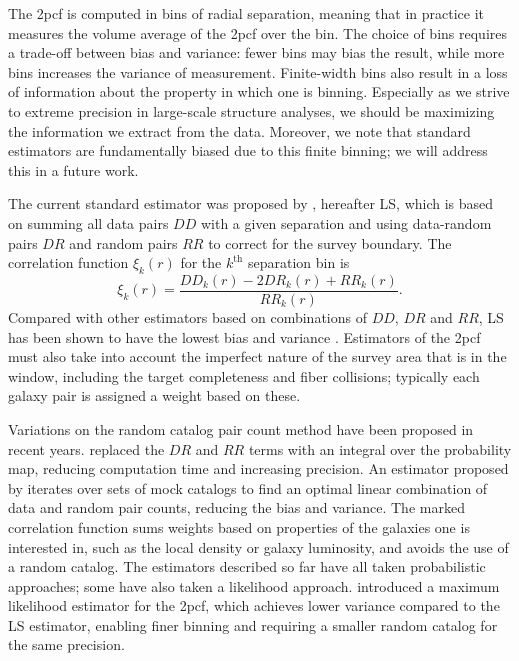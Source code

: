 \documentclass[twocolumn]{aastex62}
\newcommand{\cf}{2pcf\xspace} %
\begin{document}
The \cf is computed in bins of radial separation, meaning that in practice it measures the volume average of the \cf over the bin.
The choice of bins requires a trade-off between bias and variance: fewer bins may bias the result, while more bins increases the variance of measurement.
Finite-width bins also result in a loss of information about the property in which one is binning. 
Especially as we strive to extreme precision in large-scale structure analyses, we should be maximizing the information we extract from the data.
Moreover, we note that standard estimators are fundamentally biased due to this finite binning; we will address this in a future work. %

The current standard estimator was proposed by \cite{LandySzalay1993}, hereafter LS, which is based on summing all data pairs $DD$ with a given separation and using data-random pairs $DR$ and random pairs $RR$ to correct for the survey boundary. The correlation function $\xi_k(r)$ for the $k^\mathrm{th}$ separation bin is
\begin{equation}
\xi_k(r) = \frac{DD_k(r) - 2DR_k(r) + RR_k(r)}{RR_k(r)}.
\end{equation}
Compared with other estimators based on combinations of $DD$, $DR$ and $RR$, LS has been shown to have the lowest bias and variance \citep{Kerscher2000}.
Estimators of the \cf must also take into account the imperfect nature of the survey area that is in the window, including the target completeness and fiber collisions; typically each galaxy pair is assigned a weight based on these.

Variations on the random catalog pair count method have been proposed in recent years.
\cite{Demina2016} replaced the $DR$ and $RR$ terms with an integral over the probability map, reducing computation time and increasing precision.
An estimator proposed by \cite{VargasMagana2013} iterates over sets of mock catalogs to find an optimal linear combination of data and random pair counts, reducing the bias and variance.
The marked correlation function \citep{WhitePadmanabhan2009} sums weights based on properties of the galaxies one is interested in, such as the local density or galaxy luminosity, and avoids the use of a random catalog.
The estimators described so far have all taken probabilistic approaches; some have also taken a likelihood approach.
\cite{BaxterRozo2013} introduced a maximum likelihood estimator for the \cf, which achieves lower variance compared to the LS estimator, enabling finer binning and requiring a smaller random catalog for the same precision.
\end{document}
